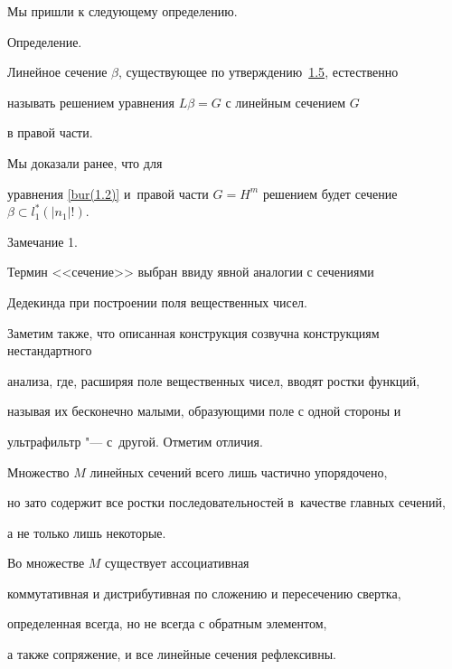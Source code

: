 \medskip



Мы пришли к следующему определению.



\smallskip



{\small\sc Определение.}

Линейное сечение $\beta$, существующее по утверждению~\hyperlink{bur:utv1.5}{1.5}, естественно

называть решением уравнения $L \beta = G$ с линейным сечением $G$

в правой части.



\smallskip



Мы доказали ранее, что для

уравнения \eqref{bur(1.2)} и~правой части $G = H^m$ решением будет сечение $\beta \subset l_1^* (|n_1| !)$.



\smallskip



\hypertarget{bur:zam}{}



{\small\sc Замечание 1.}

Термин <<сечение>> выбран ввиду явной аналогии с сечениями

Дедекинда при построении поля вещественных чисел.

Заметим также, что описанная конструкция созвучна конструкциям нестандартного

анализа, где, расширяя поле вещественных чисел, вводят ростки функций,

называя их бесконечно малыми, образующими поле с одной стороны и

ультрафильтр "--- с~другой. Отметим отличия.

Множество $M$ линейных сечений всего лишь частично упорядочено,

но зато содержит все ростки последовательностей в~качестве главных сечений,

а не только лишь некоторые.

Во множестве $M$ существует ассоциативная

коммутативная и дистрибутивная по сложению и пересечению свертка,

определенная всегда, но не всегда с обратным элементом,

а также сопряжение, и все линейные сечения рефлексивны.

